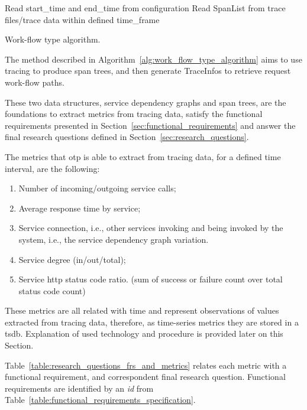 \begin{algorithm}
    Read start\_time and end\_time from configuration\;
    Read SpanList from trace files/trace data within defined time\_frame\;
    \caption{Work-flow type algorithm.}
    \label{alg:work_flow_type_algorithm}
\end{algorithm}

The method described in Algorithm~\ref{alg:work_flow_type_algorithm} aims to use tracing to produce span trees, and then generate TraceInfos to retrieve request work-flow paths.

These two data structures, service dependency graphs and span trees, are the foundations to extract metrics from tracing data, satisfy the functional requirements presented in Section~\ref{sec:functional_requirements} and answer the final research questions defined in Section~\ref{sec:research_questions}.

The metrics that \gls{otp} is able to extract from tracing data, for a defined time interval, are the following:

\begin{enumerate}
    \item Number of incoming/outgoing service calls;
    \item Average response time by service;
    \item Service connection, i.e., other services invoking and being invoked by the system, i.e., the service dependency graph variation.
    \item Service degree (in/out/total);
    \item Service \gls{http} status code ratio. (sum of success or failure count over total status code count)
\end{enumerate}

These metrics are all related with time and represent observations of values extracted from tracing data, therefore, as time-series metrics they are stored in a \gls{tsdb}. Explanation of used technology and procedure is provided later on this Section.

Table~\ref{table:research_questions_frs_and_metrics} relates each metric with a functional requirement, and correspondent final research question. Functional requirements are identified by an \emph{id} from Table~\ref{table:functional_requirements_specification}.

